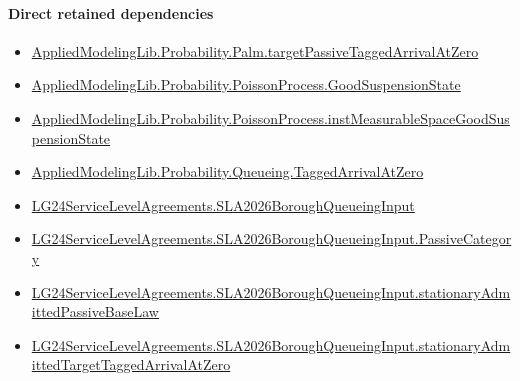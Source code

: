 \documentclass[10pt]{article}
\begin{document}
\paragraph{Direct retained dependencies}
\begin{itemize}\raggedright
\item \hyperlink{governing-declaration-5a10835f452c324b}{Applied\allowbreak{}Modeling\allowbreak{}Lib.\allowbreak{}Probability.\allowbreak{}Palm.\allowbreak{}target\allowbreak{}Passive\allowbreak{}Tagged\allowbreak{}Arrival\allowbreak{}At\allowbreak{}Zero}
\item \hyperlink{governing-declaration-ab1cfe37ad8c32b0}{Applied\allowbreak{}Modeling\allowbreak{}Lib.\allowbreak{}Probability.\allowbreak{}Poisson\allowbreak{}Process.\allowbreak{}Good\allowbreak{}Suspension\allowbreak{}State}
\item \hyperlink{governing-declaration-a8385d799d0a4d16}{Applied\allowbreak{}Modeling\allowbreak{}Lib.\allowbreak{}Probability.\allowbreak{}Poisson\allowbreak{}Process.\allowbreak{}inst\allowbreak{}Measurable\allowbreak{}Space\allowbreak{}Good\allowbreak{}Suspension\allowbreak{}State}
\item \hyperlink{governing-declaration-a69bedb5b0d420c6}{Applied\allowbreak{}Modeling\allowbreak{}Lib.\allowbreak{}Probability.\allowbreak{}Queueing.\allowbreak{}Tagged\allowbreak{}Arrival\allowbreak{}At\allowbreak{}Zero}
\item \hyperlink{governing-declaration-3e29dad51cd2861a}{LG24\allowbreak{}Service\allowbreak{}Level\allowbreak{}Agreements.\allowbreak{}SLA2026\allowbreak{}Borough\allowbreak{}Queueing\allowbreak{}Input}
\item \hyperlink{governing-declaration-abc91e26948cf0a3}{LG24\allowbreak{}Service\allowbreak{}Level\allowbreak{}Agreements.\allowbreak{}SLA2026\allowbreak{}Borough\allowbreak{}Queueing\allowbreak{}Input.\allowbreak{}Passive\allowbreak{}Category}
\item \hyperlink{governing-declaration-e413da39fd340589}{LG24\allowbreak{}Service\allowbreak{}Level\allowbreak{}Agreements.\allowbreak{}SLA2026\allowbreak{}Borough\allowbreak{}Queueing\allowbreak{}Input.\allowbreak{}stationary\allowbreak{}Admitted\allowbreak{}Passive\allowbreak{}Base\allowbreak{}Law}
\item \hyperlink{governing-declaration-8585bd142da9416c}{LG24\allowbreak{}Service\allowbreak{}Level\allowbreak{}Agreements.\allowbreak{}SLA2026\allowbreak{}Borough\allowbreak{}Queueing\allowbreak{}Input.\allowbreak{}stationary\allowbreak{}Admitted\allowbreak{}Target\allowbreak{}Tagged\allowbreak{}Arrival\allowbreak{}At\allowbreak{}Zero}
\end{itemize}
\hypertarget{governing-declaration-829935ff80d7c57f}{}
\end{document}
